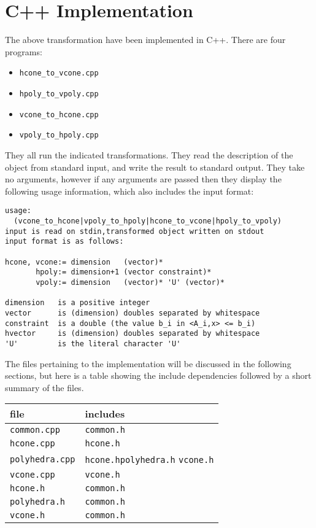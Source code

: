\chapter{C++ Implementation}

The above transformation have been implemented in C++.  There are four programs:
\begin{itemize}
	\item \texttt{hcone\_to\_vcone.cpp}
	\item \texttt{hpoly\_to\_vpoly.cpp}
	\item \texttt{vcone\_to\_hcone.cpp}
	\item \texttt{vpoly\_to\_hpoly.cpp}
\end{itemize}
They all run the indicated transformations.  They read the description of the object from standard input, and write the result to standard output.  They take no arguments, however if any arguments are passed then they display the following usage information, which also includes the input format:
\begin{verbatim}
usage: 
  (vcone_to_hcone|vpoly_to_hpoly|hcone_to_vcone|hpoly_to_vpoly)
input is read on stdin,transformed object written on stdout
input format is as follows:
 
hcone, vcone:= dimension   (vector)*
       hpoly:= dimension+1 (vector constraint)*
       vpoly:= dimension   (vector)* 'U' (vector)*

dimension   is a positive integer
vector      is (dimension) doubles separated by whitespace
constraint  is a double (the value b_i in <A_i,x> <= b_i)
hvector     is (dimension) doubles separated by whitespace
'U'         is the literal character 'U'
\end{verbatim}

The files pertaining to the implementation will be discussed in the following sections, but here is a table showing the include dependencies followed by a short summary of the files. \\

\begin{tabular}{|l|p{9em}|}
\hline
file & includes \\
\hline
\texttt{common.cpp} &  \texttt{common.h} \\
\texttt{hcone.cpp} &  \texttt{hcone.h} \\
\texttt{polyhedra.cpp} &   \texttt{hcone.h}\hfill \texttt{polyhedra.h} \hfill\hspace{2em} \texttt{vcone.h} \\
\texttt{vcone.cpp} &  \texttt{vcone.h} \\
\hline
\texttt{hcone.h} &  \texttt{common.h} \\
\texttt{polyhedra.h} &  \texttt{common.h} \\
\texttt{vcone.h} &  \texttt{common.h} \\
\hline
\end{tabular}\\

